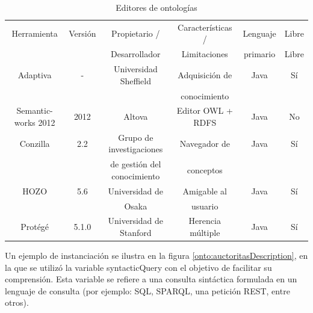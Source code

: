 \begin{table}
\begin{tabular}{|c|c|c|c|c|c|}
\hline 
Herramienta & Versión & Propietario / & Características / & Lenguaje & Libre \\ 
 &  & Desarrollador & Limitaciones & primario & Libre \\
\hline 
Adaptiva & - & Universidad Sheffield & Adquisición de & Java & Sí \\ 
 &  &  & conocimiento &  &  \\
\hline 
Semantic-works 2012 & 2012 & Altova & Editor OWL + RDFS & Java & No \\ 
\hline 
Conzilla & 2.2 & Grupo de investigaciones & Navegador de  & Java & Sí \\ 
 & & de gestión del conocimiento & conceptos &  &  \\
\hline 
HOZO & 5.6 & Universidad de & Amigable al & Java & Sí \\ 
 & & Osaka & usuario & & \\
\hline 
Protégé & 5.1.0 & Universidad de Stanford & Herencia múltiple & Java & Sí \\ 
\hline 
\end{tabular} 
\caption{Editores de ontologías}
\label{tab: editores}
\end{table}

Un ejemplo de instanciación se ilustra en la figura \ref{onto:auctoritasDescription}, en la que se utilizó la variable syntacticQuery con el objetivo de facilitar su comprensión. Esta variable se refiere a una consulta sintáctica formulada en un lenguaje de consulta (por ejemplo: SQL, SPARQL, una petición REST, entre otros).

